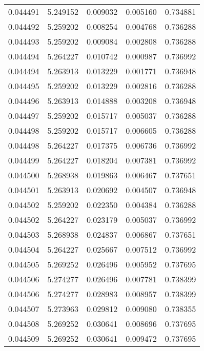 \begin{tabular}{lrrrr}
0.044491    &  5.249152 &  0.009032 &  0.005160 &             0.734881 \\
0.044492    &  5.259202 &  0.008254 &  0.004768 &             0.736288 \\
0.044493    &  5.259202 &  0.009084 &  0.002808 &             0.736288 \\
0.044494    &  5.264227 &  0.010742 &  0.000987 &             0.736992 \\
0.044494    &  5.263913 &  0.013229 &  0.001771 &             0.736948 \\
0.044495    &  5.259202 &  0.013229 &  0.002816 &             0.736288 \\
0.044496    &  5.263913 &  0.014888 &  0.003208 &             0.736948 \\
0.044497    &  5.259202 &  0.015717 &  0.005037 &             0.736288 \\
0.044498    &  5.259202 &  0.015717 &  0.006605 &             0.736288 \\
0.044498    &  5.264227 &  0.017375 &  0.006736 &             0.736992 \\
0.044499    &  5.264227 &  0.018204 &  0.007381 &             0.736992 \\
0.044500    &  5.268938 &  0.019863 &  0.006467 &             0.737651 \\
0.044501    &  5.263913 &  0.020692 &  0.004507 &             0.736948 \\
0.044502    &  5.259202 &  0.022350 &  0.004384 &             0.736288 \\
0.044502    &  5.264227 &  0.023179 &  0.005037 &             0.736992 \\
0.044503    &  5.268938 &  0.024837 &  0.006867 &             0.737651 \\
0.044504    &  5.264227 &  0.025667 &  0.007512 &             0.736992 \\
0.044505    &  5.269252 &  0.026496 &  0.005952 &             0.737695 \\
0.044506    &  5.274277 &  0.026496 &  0.007781 &             0.738399 \\
0.044506    &  5.274277 &  0.028983 &  0.008957 &             0.738399 \\
0.044507    &  5.273963 &  0.029812 &  0.009080 &             0.738355 \\
0.044508    &  5.269252 &  0.030641 &  0.008696 &             0.737695 \\
0.044509    &  5.269252 &  0.030641 &  0.009472 &             0.737695 \\

\end{tabular}
